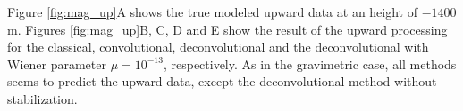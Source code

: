 Figure \ref{fig:mag_up}A shows the true modeled upward data at an height of $-1400$ m. Figures \ref{fig:mag_up}B, C, D and E show the result of the upward processing for the classical, convolutional, deconvolutional and the deconvolutional with Wiener parameter $\mu = 10^{-13}$, respectively. As in the gravimetric case, all methods seems to predict the upward data, except the deconvolutional method without stabilization.

%
%
%
%
